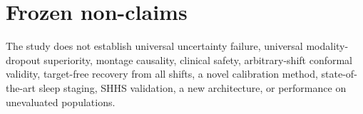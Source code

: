 \documentclass[10pt]{article}
\begin{document}
\section*{Frozen non-claims}
The study does not establish universal uncertainty failure, universal modality-dropout superiority, montage causality, clinical safety, arbitrary-shift conformal validity, target-free recovery from all shifts, a novel calibration method, state-of-the-art sleep staging, SHHS validation, a new architecture, or performance on unevaluated populations.
\end{document}
